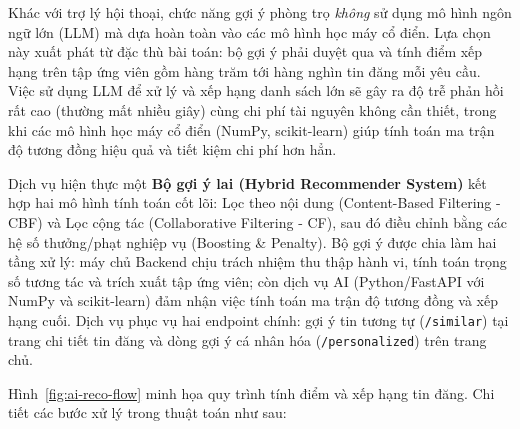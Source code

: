 Khác với trợ lý hội thoại, chức năng gợi ý phòng trọ \textit{không} sử dụng mô hình ngôn ngữ lớn (LLM) mà dựa hoàn toàn vào các mô hình học máy cổ điển. Lựa chọn này xuất phát từ đặc thù bài toán: bộ gợi ý phải duyệt qua và tính điểm xếp hạng trên tập ứng viên gồm hàng trăm tới hàng nghìn tin đăng mỗi yêu cầu. Việc sử dụng LLM để xử lý và xếp hạng danh sách lớn sẽ gây ra độ trễ phản hồi rất cao (thường mất nhiều giây) cùng chi phí tài nguyên không cần thiết, trong khi các mô hình học máy cổ điển (NumPy, scikit-learn) giúp tính toán ma trận độ tương đồng hiệu quả và tiết kiệm chi phí hơn hẳn.

Dịch vụ hiện thực một \textbf{Bộ gợi ý lai (Hybrid Recommender System)} kết hợp hai mô hình tính toán cốt lõi: Lọc theo nội dung (Content-Based Filtering - CBF) và Lọc cộng tác (Collaborative Filtering - CF), sau đó điều chỉnh bằng các hệ số thưởng/phạt nghiệp vụ (Boosting \& Penalty). Bộ gợi ý được chia làm hai tầng xử lý: máy chủ Backend chịu trách nhiệm thu thập hành vi, tính toán trọng số tương tác và trích xuất tập ứng viên; còn dịch vụ AI (Python/FastAPI với NumPy và scikit-learn) đảm nhận việc tính toán ma trận độ tương đồng và xếp hạng cuối. Dịch vụ phục vụ hai endpoint chính: gợi ý tin tương tự (\texttt{/similar}) tại trang chi tiết tin đăng và dòng gợi ý cá nhân hóa (\texttt{/personalized}) trên trang chủ.

Hình~\ref{fig:ai-reco-flow} minh họa quy trình tính điểm và xếp hạng tin đăng. Chi tiết các bước xử lý trong thuật toán như sau:

